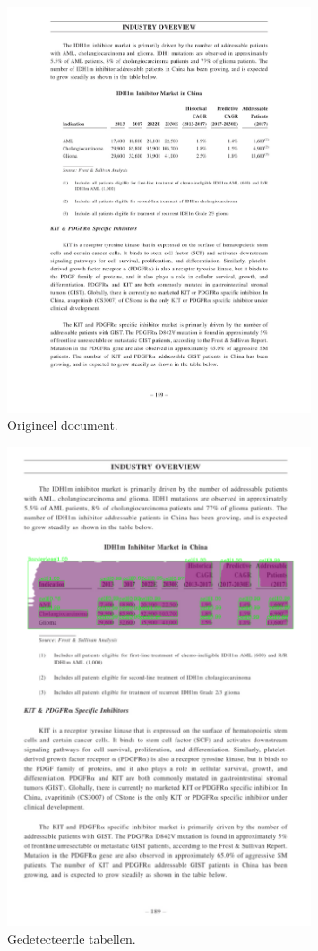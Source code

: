 \begin{figure}[H]
    \centering
    \includegraphics[width=0.8\textwidth]{test-resultaten/7/original.jpg}
    \caption{Origineel document.}
\end{figure}

\begin{figure}[H]
    \centering
    \includegraphics[width=0.8\textwidth]{test-resultaten/7/detected_tables.png}
    \caption{Gedetecteerde tabellen.}
\end{figure}

